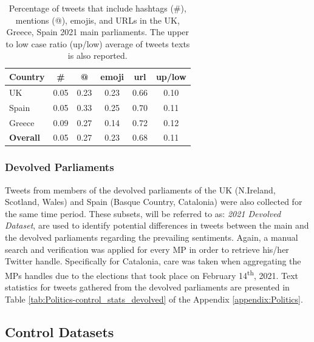 \begin{table}[ht]
    \centering
    \begin{tabular}{lccccc}
    \textbf{Country} & \textbf{\#} & \textbf{@} & \textbf{emoji} & \textbf{url} & \textbf{up/low} \\ \hline
    UK               & 0.05        & 0.23       & 0.23           & 0.66         & 0.10            \\ \hline
    Spain            & 0.05        & 0.33       & 0.25           & 0.70         & 0.11            \\ \hline
    Greece           & 0.09        & 0.27       & 0.14           & 0.72         & 0.12            \\ \hline
    \textbf{Overall} & 0.05        & 0.27       & 0.23           & 0.68         & 0.11           
    \end{tabular}
    \caption{Percentage of tweets that include  hashtags (\#), mentions (@), emojis, and URLs in the UK, Greece, Spain 2021 main parliaments. The upper to low case ratio (up/low) average of tweets texts is also reported.}
    \label{tab:control_stats}
\end{table}

\vspace{-14pt}
\subsubsection{Devolved Parliaments}\label{sec:devolved_2021}
Tweets from members of the devolved parliaments of the UK (N.Ireland, Scotland, Wales) and Spain (Basque Country, Catalonia) were also collected for the same time period.
These subsets, will be referred to as: \textit{2021 Devolved Dataset}, are used to identify potential differences in tweets between the main and the devolved parliaments regarding the prevailing sentiments. Again, a manual search and verification was applied for every \ac{MP} in order to retrieve his/her Twitter handle. Specifically for Catalonia, care was taken when aggregating the \acp{MP} handles due to the elections that took place on February 14\textsuperscript{th}, 2021. Text statistics for tweets gathered from the devolved parliaments are presented in Table \ref{tab:Politics-control_stats_devolved} of the Appendix \ref{appendix:Politics}.



\subsection{Control Datasets}
\label{sec:controldat}

